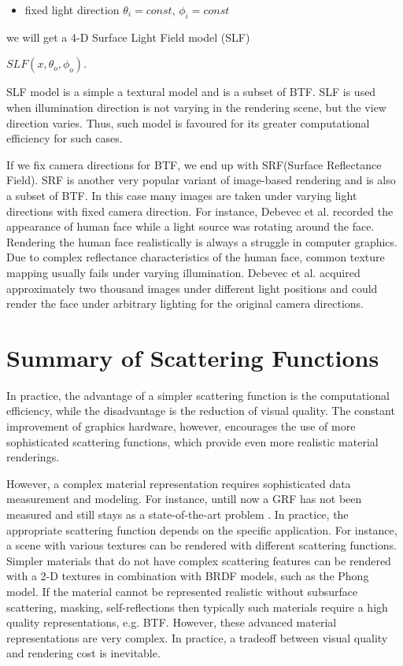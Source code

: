 \begin{itemize}
\item fixed light direction $\theta_{i} = const$, $\phi_{i}=const$
\end{itemize}
we will get a 4-D Surface Light Field model (SLF)
 \begin{center}
$SLF(x,\theta_{o} ,\phi_{o})$.
 \end{center}
 
 SLF model is a simple a textural model and is a subset of BTF. 
 SLF is used when illumination direction is not varying in the rendering scene, but the view direction varies.
 Thus, such model is favoured for its greater computational efficiency for such cases.


 If we fix camera directions for BTF, we end up with SRF(Surface Reflectance Field).
 SRF is another very popular variant of image-based rendering and is also a subset of BTF. 
 In this case many images are taken under varying light directions with fixed camera direction\cite{star2004}. 
 For instance, Debevec et al. \cite{debevec} recorded the appearance of human face while a
light source was rotating around the face. Rendering the human face realistically is always a struggle in computer graphics.
Due to complex reflectance characteristics of the human face, common texture mapping usually fails under varying illumination.
 Debevec et al. acquired approximately two thousand images under different light positions and could render the face under arbitrary lighting for the original camera directions. 


\section{Summary of Scattering Functions}
\label{section:attrib}
In practice, the advantage of a simpler scattering function is the computational efficiency, 
while the disadvantage is the reduction of visual quality. 
The constant improvement of graphics hardware, however, encourages the use of more sophisticated scattering functions, which provide even more realistic material renderings. 
 
However, a complex material representation requires sophisticated data measurement and modeling.
For instance, untill now a GRF has not been measured and still stays as a state-of-the-art problem \cite{haindl_visual}.
In practice, the appropriate scattering function depends on the specific application.
For instance, a scene with various textures can be rendered with different scattering functions. 
Simpler materials that do not have complex scattering features can be rendered with a 2-D textures in combination with BRDF models, such as the Phong model.
If the material cannot be represented realistic without subsurface scattering, masking, self-reflections then typically such materials require a high quality representations, e.g. BTF.
However, these advanced material representations are very complex.
In practice, a tradeoff between visual quality and rendering cost is inevitable. 




